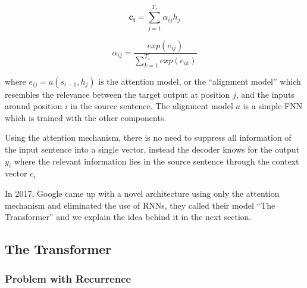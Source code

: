 \begin{equation}
\label{eq:18}
\mathbf{c_i} = \sum_{j=1}^{T_x} \alpha_{ij} h_j
\end{equation}

\begin{equation}
\label{eq:19}
\alpha_{ij} = \frac{ exp(e_{ij}) }{ \sum_{k=1}^{T_x} exp(e_{ik}) }
\end{equation}

where $e_{ij} = a(s_{i-1}, h_j)$ is the attention model, or the \enquote{alignment model} which resembles the relevance between the target output at position $j$, and the inputs around position $i$ in the source sentence. The alignment model $a$ is a simple \ac{FNN} which is trained with the other components.

Using the attention mechanism, there is no need to suppress all information of the input sentence into a single vector, instead the decoder knows for the output $y_i$ where the relevant information lies in the source sentence through the context vector $c_i$






In 2017, Google came up with a novel architecture using only the attention mechanism and eliminated the use of \ac{RNN}s, they called their model \enquote{The Transformer} \cite{vaswani2017attention} and we explain the idea behind it in the next section.

\subsection{The Transformer} 
\label{bg:s4_sub3}


\subsubsection{Problem with Recurrence} 
\label{bg:s4_sub3_subsub1}

